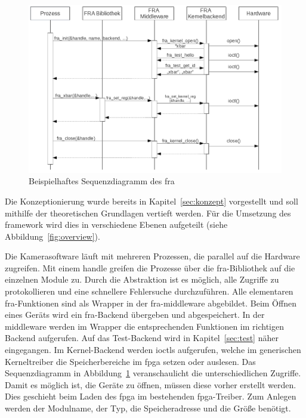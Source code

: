 \begin{figure}[!hbtp]
	\centering
	\includegraphics[width = \linewidth]{pictures/2020-01-10-SequKernel.png}
	\smallskip
	\caption{Beispielhaftes Sequenzdiagramm des \ac{fra}}
	\label{fig:sequkern}
\end{figure} 

Die Konzeptionierung wurde bereits in Kapitel~\ref{sec:konzept} vorgestellt und soll mithilfe der theoretischen Grundlagen vertieft werden. Für die Umsetzung des \gls{framework} wird dies in verschiedene Ebenen aufgeteilt (siehe Abbildung~\ref{fig:overview}). 


Die Kamerasoftware läuft mit mehreren Prozessen, die parallel auf die Hardware zugreifen. Mit einem \gls{handle} greifen die Prozesse über die \ac{fra}-Bibliothek auf die einzelnen Module zu. Durch die Abstraktion ist es möglich, alle Zugriffe zu protokollieren und eine schnellere Fehlersuche durchzuführen. 
Alle elementaren \ac{fra}-Funktionen sind als Wrapper in der \ac{fra}-\gls{middleware} abgebildet. Beim Öffnen eines Geräts wird ein \ac{fra}-Backend übergeben und abgespeichert. In der \gls{middleware} werden im Wrapper die entsprechenden Funktionen im richtigen Backend aufgerufen. 
Auf das Test-Backend wird in Kapitel~\ref{sec:test} näher eingegangen. Im Kernel-Backend werden \ac{ioctl}s aufgerufen, welche im generischen Kerneltreiber die Speicherbereiche im \ac{fpga} setzen oder auslesen.
Das Sequenzdiagramm in Abbildung~\ref{fig:sequkern} veranschaulicht die unterschiedlichen Zugriffe.
Damit es möglich ist, die Geräte zu öffnen, müssen diese vorher erstellt werden. Dies geschieht beim Laden des \ac{fpga} im bestehenden \ac{fpga}-Treiber. Zum Anlegen werden der Modulname, der Typ, die Speicheradresse und die Größe benötigt. 





